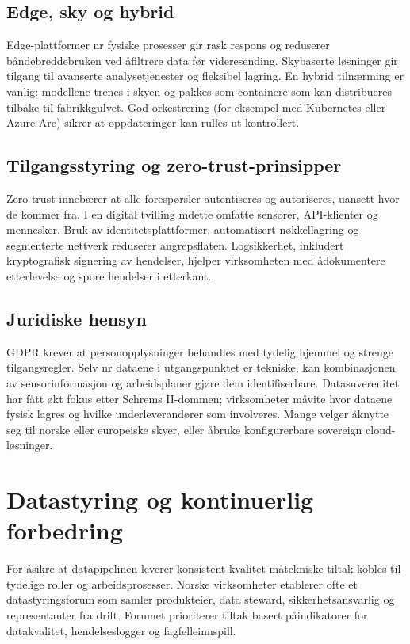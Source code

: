 \subsection{Edge, sky og hybrid}
Edge-plattformer n\a r fysiske prosesser gir rask respons og reduserer b\aa ndebreddebruken ved \aa filtrere data f\o r videresending. Skybaserte løsninger gir tilgang til avanserte analysetjenester og fleksibel lagring. En hybrid tilnærming er vanlig: modellene trenes i skyen og pakkes som containere som kan distribueres tilbake til fabrikkgulvet. God orkestrering (for eksempel med Kubernetes eller Azure Arc) sikrer at oppdateringer kan rulles ut kontrollert.

\subsection{Tilgangsstyring og zero-trust-prinsipper}
Zero-trust inneb\ae rer at alle foresp\o rsler autentiseres og autoriseres, uansett hvor de kommer fra. I en digital tvilling m\a dette omfatte sensorer, API-klienter og mennesker. Bruk av identitetsplattformer, automatisert n\o kkellagring og segmenterte nettverk reduserer angrepsflaten. Logsikkerhet, inkludert kryptografisk signering av hendelser, hjelper virksomheten med \aa dokumentere etterlevelse og spore hendelser i etterkant.

\subsection{Juridiske hensyn}
GDPR krever at personopplysninger behandles med tydelig hjemmel og strenge tilgangsregler. Selv n\a r dataene i utgangspunktet er tekniske, kan kombinasjonen av sensorinformasjon og arbeidsplaner gj\o re dem identifiserbare. Datasuverenitet har f\aa tt \o kt fokus etter Schrems II-dommen; virksomheter m\aa vite hvor dataene fysisk lagres og hvilke underleverand\o rer som involveres. Mange velger \aa knytte seg til norske eller europeiske skyer, eller \aa bruke konfigurerbare sovereign cloud-l\o sninger.

\section{Datastyring og kontinuerlig forbedring}
For \aa sikre at datapipelinen leverer konsistent kvalitet m\aa tekniske tiltak kobles til tydelige roller og arbeidsprosesser. Norske virksomheter etablerer ofte et datastyringsforum som samler produkteier, data steward, sikkerhetsansvarlig og representanter fra drift. Forumet prioriterer tiltak basert p\aa indikatorer for datakvalitet, hendelseslogger og fagfelleinnspill.

